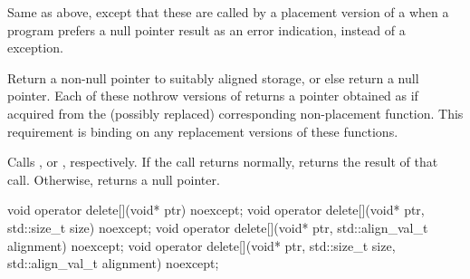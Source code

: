 \begin{itemdescr}
\pnum
\effects
Same as above, except that these are called by a placement version of a
when a \Cpp{} program prefers a null pointer result as an error indication,
instead of a
exception.

\pnum
\replaceable
{}

\pnum
\required
Return a non-null pointer to suitably aligned storage,
or else return a null pointer.
Each of these nothrow versions of
returns a pointer obtained as if
acquired from the (possibly replaced)
corresponding non-placement function.
This requirement is binding on any replacement versions of these functions.

\pnum
{}
Calls ,
or ,
respectively.
If the call returns normally,
returns the result of that call.
Otherwise, returns a null pointer.
\end{itemdescr}

%
\begin{itemdecl}
void operator delete[](void* ptr) noexcept;
void operator delete[](void* ptr, std::size_t size) noexcept;
void operator delete[](void* ptr, std::align_val_t alignment) noexcept;
void operator delete[](void* ptr, std::size_t size, std::align_val_t alignment) noexcept;
\end{itemdecl}


